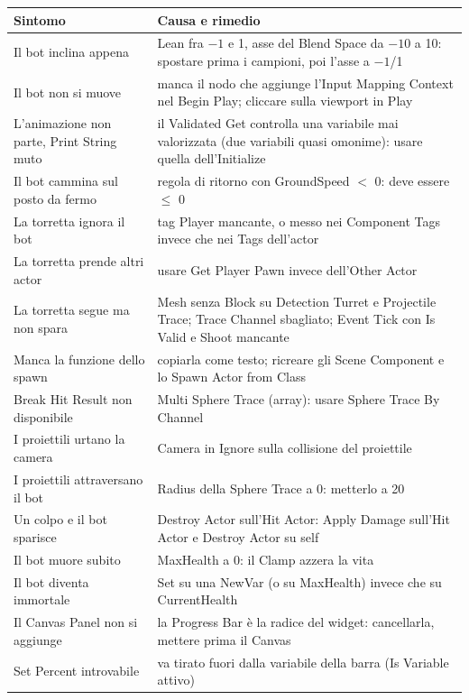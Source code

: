 \begin{table}[htbp]
\centering
\small
\begin{tabular}{@{}p{5.4cm}p{8.6cm}@{}}
\toprule
\textbf{Sintomo} & \textbf{Causa e rimedio} \\
\midrule
Il bot inclina appena & Lean fra $-1$ e 1, asse del Blend Space da $-10$ a 10: spostare
prima i campioni, poi l'asse a $-1$/1 \\
Il bot non si muove & manca il nodo che aggiunge l'Input Mapping Context nel Begin Play;
cliccare sulla viewport in Play \\
L'animazione non parte, Print String muto & il Validated Get controlla una variabile mai
valorizzata (due variabili quasi omonime): usare quella dell'Initialize \\
Il bot cammina sul posto da fermo & regola di ritorno con GroundSpeed $<$ 0: deve essere
$\le$ 0 \\
La torretta ignora il bot & tag Player mancante, o messo nei Component Tags invece che
nei Tags dell'actor \\
La torretta prende altri actor & usare Get Player Pawn invece dell'Other Actor \\
La torretta segue ma non spara & Mesh senza Block su Detection Turret e Projectile Trace;
Trace Channel sbagliato; Event Tick con Is Valid e Shoot mancante \\
Manca la funzione dello spawn & copiarla come testo; ricreare gli Scene Component e lo
Spawn Actor from Class \\
Break Hit Result non disponibile & Multi Sphere Trace (array): usare Sphere Trace By
Channel \\
I proiettili urtano la camera & Camera in Ignore sulla collisione del proiettile \\
I proiettili attraversano il bot & Radius della Sphere Trace a 0: metterlo a 20 \\
Un colpo e il bot sparisce & Destroy Actor sull'Hit Actor: Apply Damage sull'Hit Actor e
Destroy Actor su self \\
Il bot muore subito & MaxHealth a 0: il Clamp azzera la vita \\
Il bot diventa immortale & Set su una NewVar (o su MaxHealth) invece che su CurrentHealth
\\
Il Canvas Panel non si aggiunge & la Progress Bar è la radice del widget: cancellarla,
mettere prima il Canvas \\
Set Percent introvabile & va tirato fuori dalla variabile della barra (Is Variable
attivo) \\

\end{tabular}
\end{table}

